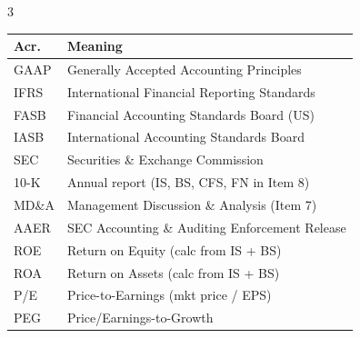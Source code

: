 \documentclass[10pt]{article}
\begin{document}
\begin{multicols}{3}
{\begin{tabular}{@{}l@{\ }l@{}}
\toprule
Acr. & Meaning \\
\midrule
GAAP  & Generally Accepted Accounting Principles \\
IFRS  & International Financial Reporting Standards \\
FASB  & Financial Accounting Standards Board (US) \\
IASB  & International Accounting Standards Board \\
SEC   & Securities \& Exchange Commission \\
10-K  & Annual report (IS, BS, CFS, FN in Item 8) \\
MD\&A & Management Discussion \& Analysis (Item 7) \\
AAER  & SEC Accounting \& Auditing Enforcement Release \\
ROE   & Return on Equity (calc from IS + BS) \\
ROA   & Return on Assets (calc from IS + BS) \\
P/E   & Price-to-Earnings (mkt price / EPS) \\
PEG   & Price/Earnings-to-Growth \\
\bottomrule
\end{tabular}}

\end{multicols}
\end{document}
